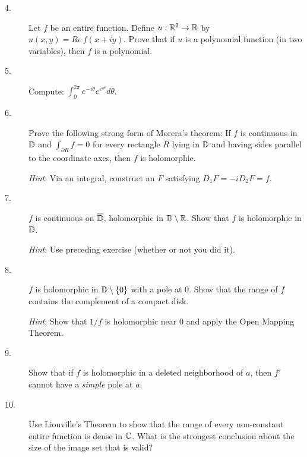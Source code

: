 \documentclass[bbb]{report}
\def\ds{\displaystyle}
\def\R{{\Bbb R}}
\def\D{{\Bbb D}}
\def\C{{\Bbb C}}
\begin{document}
\begin{Large}
\begin{description}
\vspace{.2in}
\item[4.]
Let $f$ be an entire function. Define $u:\R^2\to\R$ by
$u(x,y)= Re\,f(x+iy)$.
Prove that if $u$ is a polynomial function (in two variables),
then $f$ is a polynomial.


\vspace{.2in}
\item[5.]
Compute: \quad $\ds\int^{2\pi}_0 e^{-i\theta} e^{e^{i\theta}} d\theta$.

\vfill
\pagebreak

\vspace{.2in}
\item[6.]
Prove the following strong form of Morera's theorem:
If $f$ is continuous in $\D$ and $\int_{\partial R}f=0$ for every
rectangle $R$ lying in $\D$ and having sides parallel to the
coordinate axes, then $f$ is holomorphic.

\item[\quad]  {\it Hint}: Via an integral, construct an $F$ satisfying
$D_1F=-iD_2F=f$.


\vspace{.2in}
\item[7.]
$f$ is continuous on $\overline{\D}$, holomorphic in $\D\setminus\R$.
Show that $f$ is holomorphic in $\D$.

\item[\quad]  {\it Hint}: Use preceding exercise
(whether or not you did it).


\vspace{.2in}
\item[8.]
$f$ is holomorphic in $\D\setminus\{0\}$ with a pole at $0$.
Show that the range of $f$ contains the complement of a compact disk.

\item[\quad] {\it Hint}: Show that $1/f$ is
holomorphic near $0$ and apply the Open Mapping Theorem.

\vspace{.2in}
\item[9.]
Show that if $f$ is holomorphic in a deleted neighborhood of $a$,
then $f'$ cannot have a {\it simple} pole at $a$.


\vspace{.2in}
\item[10.]
Use Liouville's Theorem to show that the range of every
non-constant entire function is dense in $\C$. What is the
strongest conclusion about the size of the image set that is valid?



\vfill
\clearpage


\end{description}
\end{Large}
\end{document}
